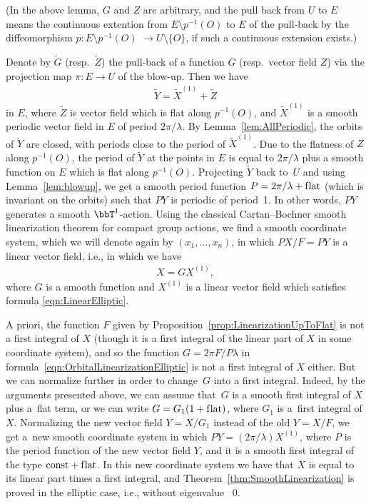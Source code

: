 (In the above lemma, $G$ and $Z$ are arbitrary, and the pull back from
$U$ to $E$ means the con\-ti\-nuous extention from $E \setminus p^{-1}(O)$
to $E$ of the pull-back by the dif\/feomorphism $p\colon E \setminus p^{-1}(O)$ $\to U \setminus \{O\}$, if such a continuous extension exists.)

Denote by $\tilde G$ (resp.~$\tilde Z$) the pull-back of a function $G$ (resp.\ vector f\/ield $Z$) via the projection
map $\pi\colon E \to U$ of the blow-up. Then we have
\begin{gather*}
\tilde Y = \tilde X^{(1)} + \tilde Z
\end{gather*}
in $E$, where $\tilde Z$ is vector f\/ield which is f\/lat along $p^{-1}(O)$, and $\tilde X^{(1)}$ is a smooth periodic vector f\/ield
in $E$ of period $2\pi/\lambda$. By Lemma~\ref{lem:AllPeriodic}, the orbits of $\tilde Y$ are closed, with periods close
to the period of $\tilde X^{(1)}$. Due to the f\/latness of $Z$ along $p^{-1}(O)$, the period of $\tilde Y$ at the points in $E$
is equal to $2\pi/\lambda$ plus a smooth function on $E$ which is f\/lat along $p^{-1}(O)$. Projecting $\tilde Y$ back to~$U$
and using Lemma~\ref{lem:blowup}, we get a smooth period function $P = 2\pi/\lambda + \text{f\/lat}$
(which is invariant on the orbits)
such that $PY$ is periodic of period~1.
In other words, $PY$ generates a smooth $\bbT^1$-action. Using the classical Cartan--Bochner
smooth linearization theorem
for compact group actions, we f\/ind a smooth coordinate system, which we will denote again by $(x_1,\dots,x_n)$,
in which $PX/F = PY$ is a linear vector f\/ield, i.e., in which we have
\begin{gather} \label{eqn:OrbitalLinearizationElliptic}
X = GX^{(1)},
\end{gather}
where $G$ is a smooth function and $X^{(1)}$ is a linear vector f\/ield which satisf\/ies formula \eqref{eqn:LinearElliptic}.

A priori, the function $F$ given by Proposition~\ref{prop:LinearizationUpToFlat} is not a f\/irst integral of $X$
(though it is a f\/irst integral of the linear part of $X$ in some coordinate system), and so the function
$G = 2\pi F/P \lambda$ in formula~\eqref{eqn:OrbitalLinearizationElliptic} is not a f\/irst integral of $X$ either.
But we can normalize further in order to change~$G$ into a f\/irst integral. Indeed, by the arguments presented above,
we can assume that~$G$ is a smooth f\/irst integral of $X$ plus a~f\/lat term, or we can write $G = G_1 (1+ \text{f\/lat})$, where
$G_1$ is a~f\/irst integral of $X$. Normalizing the new vector f\/ield $Y = X/G_1$ instead of the old $Y = X/F$, we get a~new smooth coordinate system in which $PY = (2\pi/\lambda) X^{(1)}$, where $P$ is the period function of the new vector f\/ield $Y$,
and it is a smooth f\/irst integral of the type $\text{const} + \text{f\/lat}$. In this new coordinate system we have that $X$ is equal to
its linear part times a f\/irst integral, and Theorem~\ref{thm:SmoothLinearization}
is proved in the elliptic case, i.e., without eigenvalue ~0.

